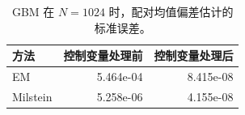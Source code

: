 \begin{table}[H]\centering\small
\caption{GBM 在 $N=1024$ 时，配对均值偏差估计的标准误差。}\label{tab:control-se}
\begin{tabular}{lrr}\toprule
方法 & 控制变量处理前 & 控制变量处理后\\\midrule
EM & 5.464e-04 & 8.415e-08\\
Milstein & 5.258e-06 & 4.155e-08\\
\bottomrule\end{tabular}
\end{table}
